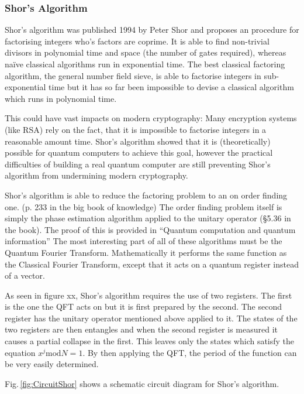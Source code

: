 \documentclass[bibliography=totocnumbered, 10pt]{article}
\theoremstyle{NoticeStyle}
\begin{document}
\subsubsection{Shor's Algorithm}
Shor's algorithm was published 1994 by Peter Shor and proposes an procedure for factorising integers who's factors are coprime. It is able to find non-trivial divisors in polynomial time and space (the number of gates required), whereas na\"ive classical algorithms run in exponential time. The best classical factoring algorithm, the general number field sieve, is able to factorise integers in sub-exponential time but it has so far been impossible to devise a classical algorithm which runs in polynomial time. 

This could have vast impacts on modern cryptography: Many encryption systems (like RSA) rely on the fact, that it is impossible to factorise integers in a reasonable amount time. Shor's algorithm showed that it is (theoretically) possible for quantum computers to achieve this goal, however the practical difficulties of building a real quantum computer are still preventing Shor's algorithm from undermining modern cryptography.

Shor's algorithm is able to reduce the factoring problem to an on order finding one. (p. 233 in the big book of knowledge) The order finding problem itself is simply the phase estimation algorithm applied to the unitary operator (\S5.36 in the book). The proof of this is provided in ``Quantum computation and quantum information''
The most interesting part of all of these algorithms must be the Quantum Fourier Transform. Mathematically it performs the same function as the Classical Fourier Transform, except that it acts on a quantum register instead of a vector.

As seen in figure xx, Shor's algorithm requires the use of two registers. The first is the one the QFT acts on but it is first prepared by the second. The second register has the unitary operator mentioned above applied to it. The states of the two registers are then entangles and when the second register is measured it causes a partial collapse in the first. This leaves only the states which satisfy the equation $x^j \textrm{mod} N = 1$. By then applying the QFT, the period of the function can be very easily determined.

Fig.\,\ref{fig:CircuitShor} shows a schematic circuit diagram for Shor's algorithm.
\end{document}
